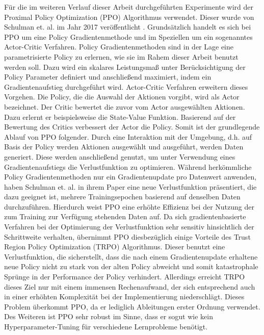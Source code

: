 Für die im weiteren Verlauf dieser Arbeit durchgeführten Experimente wird der Proximal Policy Optimization (PPO) Algorithmus verwendet. Dieser wurde von Schulman et. al. im Jahr 2017 veröffentlicht \cite{PPO}. Grundsätzlich handelt es sich bei PPO um eine Policy Gradientenmethode und im Speziellen um ein sogenanntes Actor-Critic Verfahren. Policy Gradientenmethoden sind in der Lage eine parametrisierte Policy zu erlernen, wie sie im Rahem dieser Arbeit benutzt werden soll. Dazu wird ein skalares Leistungsmaß unter Berücksichtigung der Policy Parameter definiert und anschließend maximiert, indem ein Gradientenaufstieg durchgeführt wird. Actor-Critic Verfahren erweitern dieses Vorgehen. Die Policy, die die Auswahl der Aktionen vorgibt, wird als Actor bezeichnet. Der Critic bewertet die zuvor vom Actor ausgewählten Aktionen. Dazu erlernt er beispielsweise die State-Value Funktion. Basierend auf der Bewertung des Critics verbessert der Actor die Policy. Somit ist der grundlegende Ablauf von PPO folgender. Durch eine Interaktion mit der Umgebung, d.h. auf Basis der Policy werden Aktionen ausgewählt und ausgeführt, werden Daten generiert. Diese werden anschließend genutzt, um unter Verwendung eines Gradientenaufstiegs die Verlustfunktion zu optimieren. Während herkömmliche Policy Gradientenmethoden nur ein Gradientenupdate pro Datenwert anwenden, haben Schulman et. al. in ihrem Paper eine neue Verlustfunktion präsentiert, die dazu geeignet ist, mehrere Trainingsepochen basierend auf denselben Daten durchzuführen. Hierdurch weist PPO eine erhöhte Effizienz bei der Nutzung der zum Training zur Verfügung stehenden Daten auf. Da sich gradientenbasierte Verfahren bei der Optimierung der Verlustfunktion sehr sensitiv hinsichtlich der Schrittweite verhalten, übernimmt PPO diesbezüglich einige Vorteile des Trust Region Policy Optimization (TRPO) Algorithmus. Dieser benutzt eine Verlustfunktion, die sicherstellt, dass die nach einem Gradientenupdate erhaltene neue Policy nicht zu stark von der alten Policy abweicht und somit katastrophale Sprünge in der Performance der Policy verhindert. Allerdings erreicht TRPO dieses Ziel nur mit einem immensen Rechenaufwand, der sich entsprechend auch in einer erhöhten Komplexität bei der Implementierung niederschlägt. Dieses Problem überkommt PPO, da er lediglich Ableitungen erster Ordnung verwendet. Des Weiteren ist PPO sehr robust im Sinne, dass er sogut wie kein Hyperparameter-Tuning für verschiedene Lernprobleme benötigt. \\

